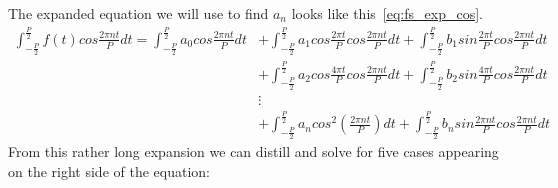 \documentclass{article}
\begin{document}
    The expanded equation we will use to find $a_n$ looks like this~\eqref{eq:fs_exp_cos}.
    \begin{equation}\label{eq:fs_exp_cos}
    \begin{split}
        \int_{-\frac{P}{2}}^{\frac{P}{2}}f(t)cos\frac{2\pi nt}{P}dt 
        = \int_{-\frac{P}{2}}^{\frac{P}{2}}a_0cos\frac{2\pi nt}{P}dt 
        & +\int_{-\frac{P}{2}}^{\frac{P}{2}}a_1cos\frac{2\pi t}{P}cos\frac{2\pi nt}{P}dt +
        \int_{-\frac{P}{2}}^{\frac{P}{2}}b_1sin\frac{2\pi t}{P}cos\frac{2\pi nt}{P}dt \\
        & + \int_{-\frac{P}{2}}^{\frac{P}{2}}a_2cos\frac{4\pi t}{P}cos\frac{2\pi nt}{P}dt +
        \int_{-\frac{P}{2}}^{\frac{P}{2}}b_2sin\frac{4\pi t}{P}cos\frac{2\pi nt}{P}dt \\
        & \vdots \\
        & + \int_{-\frac{P}{2}}^{\frac{P}{2}}a_ncos^2(\frac{2\pi nt}{P})dt +
        \int_{-\frac{P}{2}}^{\frac{P}{2}}b_nsin\frac{2\pi nt}{P}cos\frac{2\pi nt}{P}dt 
    \end{split}
    \end{equation}
    From this rather long expansion we can distill and solve for five cases appearing
    on the right side of the equation:
\end{document}
